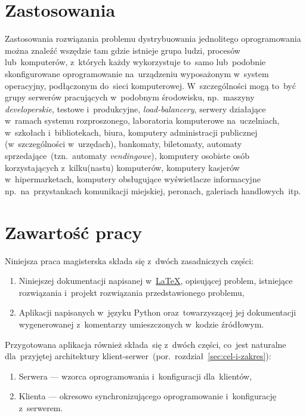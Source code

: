 \documentclass[thesis]{subfiles}
\begin{document}

\section{Zastosowania}

Zastosowania rozwiązania problemu dystrybuowania jednolitego oprogramowania można znaleźć wszędzie tam gdzie istnieje grupa ludzi, procesów lub~komputerów, z~których każdy wykorzystuje to~samo lub~podobnie skonfigurowane oprogramowanie na~urządzeniu wyposażonym w~system operacyjny, podłączonym do~sieci komputerowej. W~szczególności mogą to~być grupy serwerów pracujących w~podobnym środowisku, np.~maszyny \emph{developerskie}, testowe i~produkcyjne, \emph{load-balancery}, serwery działające w~ramach systemu rozproszonego, laboratoria komputerowe na~uczelniach, w~szkołach i~bibliotekach, biura, komputery administracji publicznej (w~szczególności w~urzędach), bankomaty, biletomaty, automaty sprzedające~(tzn.~automaty \emph{vendingowe}), komputery osobiste osób korzystających z~kilku(nastu) komputerów, komputery kasjerów w~hipermarketach, komputery obsługujące wyświetlacze informacyjne np.~na~przystankach komunikacji miejskiej, peronach, galeriach handlowych~itp.


\section{Zawartość pracy}

\noindent Niniejsza praca magisterska składa się z~dwóch zasadniczych części:\mynobreakpar
\begin{enumerate}
	\item Niniejszej dokumentacji napisanej w~\href{https://en.wikipedia.org/wiki/LaTeX}{\LaTeX}, opisującej problem, istniejące rozwiązania i~projekt rozwiązania przedstawionego problemu,
	\item Aplikacji napisanych w~języku Python oraz~towarzyszącej jej dokumentacji wygenerowanej z~komentarzy umieszczonych w~kodzie źródłowym.
\end{enumerate}
Przygotowana aplikacja również składa~się z~dwóch części, co~jest naturalne dla~przyjętej architektury klient-serwer~(por.~rozdział~\ref{sec:cel-i-zakres}):\mynobreakpar
\begin{enumerate}
	\item Serwera --- wzorca oprogramowania i~konfiguracji dla~klientów,
	\item Klienta --- okresowo synchronizującego oprogramowanie i~konfigurację z~serwerem.
\end{enumerate}
\end{document}
